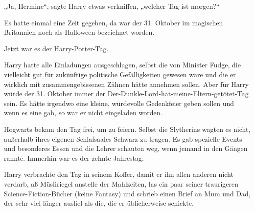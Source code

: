 „Ja, Hermine“, sagte Harry etwas verkniffen, „welcher Tag ist morgen?“


Es hatte einmal eine Zeit gegeben, da war der 31. Oktober im magischen Britannien noch als Halloween bezeichnet worden.

Jetzt war es der Harry-Potter-Tag.

Harry hatte alle Einladungen ausgeschlagen, selbst die von Minister Fudge, die vielleicht gut für zukünftige politische Gefälligkeiten gewesen wäre und die er wirklich mit zusammengebissenen Zähnen hätte annehmen sollen. Aber für Harry würde der 31. Oktober immer der Der-Dunkle-Lord-hat-meine-Eltern-getötet-Tag sein. Es hätte irgendwo eine kleine, würdevolle Gedenkfeier geben sollen und wenn es eine gab, so war er nicht eingeladen worden.

Hogwarts bekam den Tag frei, um zu feiern. Selbst die Slytherins wagten es nicht, außerhalb ihres eigenen Schlafsaales Schwarz zu tragen. Es gab spezielle Events und besonderes Essen und die Lehrer schauten weg, wenn jemand in den Gängen rannte. Immerhin war es der zehnte Jahrestag.

Harry verbrachte den Tag in seinem Koffer, damit er ihn allen anderen nicht verdarb, aß Müsliriegel anstelle der Mahlzeiten, las ein paar seiner traurigeren Science-Fiction-Bücher (keine Fantasy) und schrieb einen Brief an Mum und Dad, der sehr viel länger ausfiel als die, die er üblicherweise schickte.

